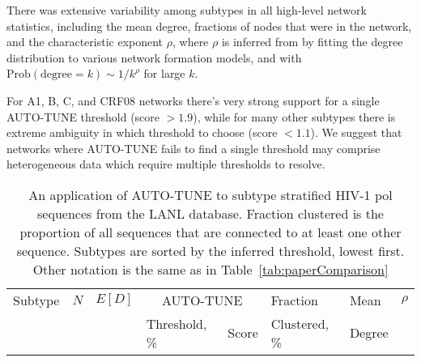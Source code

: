 \documentclass[utf8]{FrontiersinHarvard} %
\begin{document}
There was extensive variability among subtypes in all high-level network
statistics, including the mean degree, fractions of nodes that were in the
network, and the characteristic exponent $\rho$, where $\rho$ is inferred from
by fitting the degree distribution to various network formation models, and
with $\text{Prob}(\text{degree} = k) \sim 1/k^\rho$ for large $k$.

For A1, B, C, and CRF08 networks there's very strong support for a single
AUTO-TUNE threshold (score $>1.9$), while for many other subtypes there is
extreme ambiguity in which threshold to choose (score $<1.1$). We suggest that
networks where AUTO-TUNE fails to find a single threshold may comprise
heterogeneous data which require multiple thresholds to resolve.

\begin{table}[h]
	\caption{An application of AUTO-TUNE to subtype stratified HIV-1 pol sequences from the LANL database. Fraction clustered is the proportion of all sequences that are connected to at least one other sequence. Subtypes are sorted by the inferred threshold, lowest first. Other notation is the same as in Table~\ref{tab:paperComparison}}

	\vspace{10pt}
	\centering
	\begin{small}
		\label{tab:paperLANL}
		\begin{tabular}{llllllll}
			\hline
			Subtype                        & $N$   & $E[D]$ & \multicolumn{2}{c}{AUTO-TUNE} & Fraction & Mean          & $\rho$        \\
			                               &       &        & Threshold, \%                 & Score    & Clustered, \% & Degree &      \\
			\hline


\end{tabular}
\end{small}
\end{table}
\end{document}
